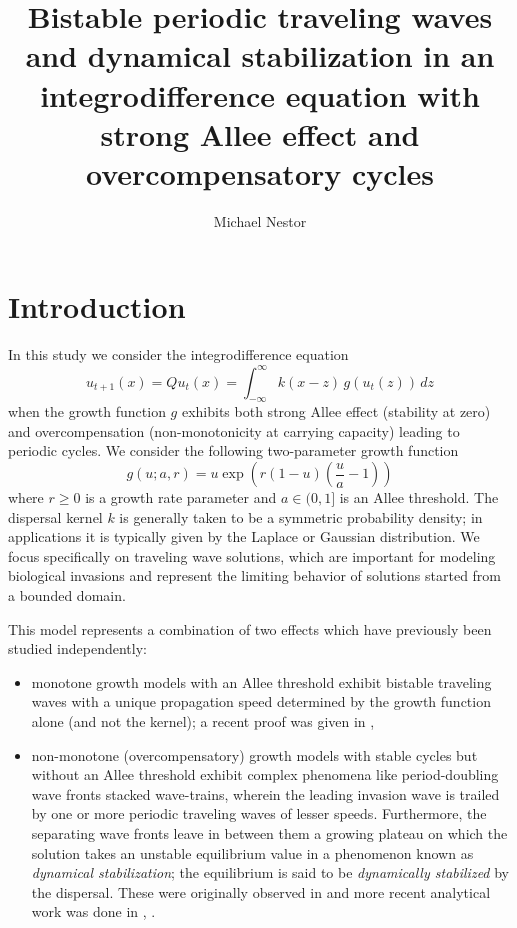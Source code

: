 \documentclass{article}
\title{Bistable periodic traveling waves and dynamical stabilization in an integrodifference equation with strong Allee effect and overcompensatory cycles}
\author{Michael Nestor}
\theoremstyle{definition}
\numberwithin{equation}{section}
\begin{document}
\maketitle

\tableofcontents

\section{Introduction}

In this study we consider the integrodifference equation
\begin{equation}
u_{t+1}(x) = Qu_t(x)=\int_{-\infty}^{\infty} k(x-z) \, g(u_t(z)) \, dz \label{ide}
\end{equation}
when the growth function $g$ exhibits both strong Allee effect (stability at zero) and overcompensation (non-monotonicity at carrying capacity) leading to periodic cycles.
We consider the following two-parameter growth function
\begin{equation} \label{g}
g(u;a,r)=u\exp(r(1-u)(\frac{u}{a}-1))
\end{equation}
where $r \geq 0$ is a growth rate parameter and $a \in (0,1]$ is an Allee threshold.
The dispersal kernel $k$ is generally taken to be a symmetric probability density; in applications it is typically given by the Laplace or Gaussian distribution.
We focus specifically on traveling wave solutions, which are important for modeling biological invasions and represent the limiting behavior of solutions started from a bounded domain.

This model represents a combination of two effects which have previously been studied independently:
\begin{itemize}
\item monotone growth models with an Allee threshold exhibit bistable traveling waves with a unique propagation speed determined by the growth function alone (and not the kernel); a recent proof was given in \cite{LO22},
\item non-monotone (overcompensatory) growth models with stable cycles but without an Allee threshold exhibit complex phenomena like period-doubling wave fronts stacked wave-trains, wherein the leading invasion wave is trailed by one or more periodic traveling waves of lesser speeds. Furthermore, the separating wave fronts leave in between them a growing plateau on which the solution takes an unstable equilibrium value in a phenomenon known as {\it dynamical stabilization}; the equilibrium is said to be {\it dynamically stabilized} by the dispersal. These were originally observed in \cite{K92} and more recent analytical work was done in \cite{BLL20}, \cite{BLL18}.
\end{itemize}
\end{document}
